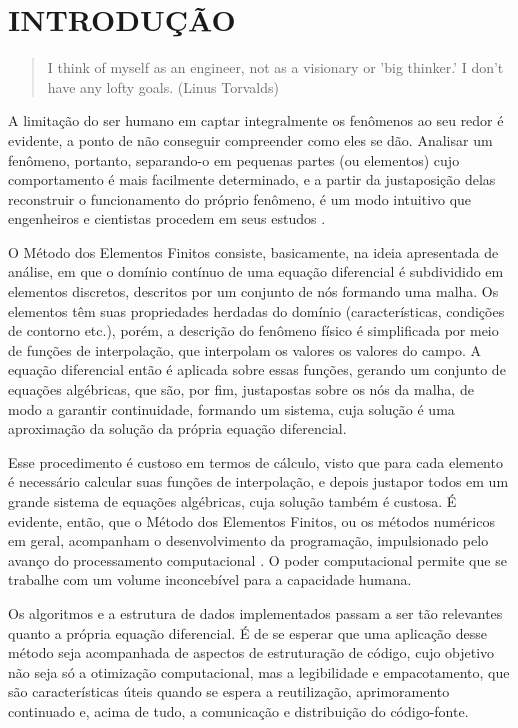 

\chapter{INTRODUÇÃO}

\begin{quote}
    I think of myself as an engineer, not as a visionary or 'big thinker.' I don't have any lofty goals.
    (Linus Torvalds)  
\end{quote}

A limitação do ser humano em captar integralmente os fenômenos ao seu redor é evidente, a ponto de não conseguir compreender como eles se dão. Analisar um fenômeno, portanto, separando-o em pequenas partes (ou elementos) cujo comportamento é mais facilmente determinado, e a partir da justaposição delas reconstruir o funcionamento do próprio fenômeno, é um modo intuitivo que engenheiros e cientistas procedem em seus estudos \cite[p. 2]{Zin}. 

O Método dos Elementos Finitos consiste, basicamente, na ideia apresentada de análise, em que o domínio contínuo de uma equação diferencial é subdividido em elementos discretos, descritos por um conjunto de nós formando uma malha. Os elementos têm suas propriedades herdadas do domínio (características, condições de contorno etc.), porém, a descrição do fenômeno físico é simplificada por meio de funções de interpolação, que interpolam os valores os valores do campo. A equação diferencial então é aplicada sobre essas funções, gerando um conjunto de equações algébricas, que são, por fim, justapostas sobre os nós da malha, de modo a garantir continuidade, formando um sistema, cuja solução é uma aproximação da solução da própria equação diferencial. \cite[pág. 1 e 2]{LIU}

Esse procedimento é custoso em termos de cálculo, visto que para cada elemento é necessário calcular suas funções de interpolação, e depois justapor todos em um grande sistema de equações algébricas, cuja solução também é custosa. É evidente, então, que o Método dos Elementos Finitos, ou os métodos numéricos em geral, acompanham o desenvolvimento da programação, impulsionado pelo avanço do processamento computacional \cite[pág. 2]{Onate}. O poder computacional permite que se trabalhe com um volume inconcebível para a capacidade humana. 

Os algoritmos e a estrutura de dados implementados passam a ser tão relevantes quanto a própria equação diferencial. É de se esperar que uma aplicação desse método seja acompanhada de aspectos de estruturação de código, cujo objetivo não seja só a otimização computacional, mas a legibilidade e empacotamento, que são características úteis quando se espera a reutilização, aprimoramento continuado e, acima de tudo, a comunicação e distribuição do código-fonte.

